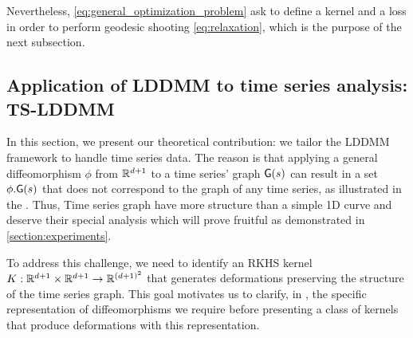     

Nevertheless, \eqref{eq:general_optimization_problem} ask to define a kernel and a loss in order to perform geodesic shooting \ref{eq:relaxation}, which is the purpose of the next subsection.
   \subsection{Application of LDDMM to time series analysis: TS-LDDMM}

        \label{section:time_series_specificity}
        In this section, we present our theoretical contribution: we tailor the LDDMM framework to handle time series data.
          The reason is that applying a general diffeomorphism $\phi$ from $\mathbb{R}^{d+1}$ to a time series' graph $\mathsf{G}(s)$ can result in a set $\phi.\mathsf{G}(s)$ that does not correspond to the graph of any time series, as illustrated in the .
           Thus, Time series graph have more structure than a simple 1D curve \cite{glaunes2008large} and deserve their special analysis which will prove fruitful as demonstrated in \ref{section:experiments}.%

To address this challenge, we need to identify an RKHS kernel $K:\mathbb{R}^{d+1}\times \mathbb{R}^{d+1}\to \mathbb{R}^{(d+1)^2}$ that generates deformations preserving the structure of the time series graph. This goal motivates us to clarify, in , the specific representation of diffeomorphisms we require before presenting a class of kernels that produce deformations with this representation.

